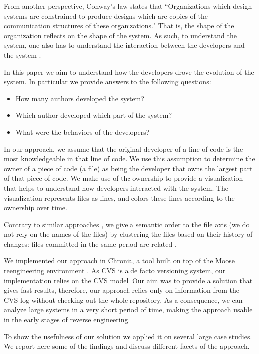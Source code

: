 From another perspective, Conway's law \cite{Conw68a} states that ``Organizations which design systems are constrained to produce designs which are copies of the communication structures of these organizations." That is, the shape of the organization reflects on the shape of the system. As such, to understand the system, one also has to understand the interaction between the developers and the system \cite{Deme02a}.

In this paper we aim to understand how the developers drove the evolution of the system. In particular we provide answers to the following questions:
\begin{itemize}
\item How many authors developed the system?
\item Which author developed which part of the system?
\item What were the behaviors of the developers?
\end{itemize}

In our approach, we assume that the original developer of a line of code is the most knowledgeable in that line of code. We use this assumption to determine the owner of a piece of code (\eg a file) as being the developer that owns the largest part of that piece of code. We make use of the ownership to provide a visualization that helps to understand how developers interacted with the system. The visualization represents files as lines, and colors these lines according to the ownership over time.

Contrary to similar approaches \cite{Ryss04a}, we give a semantic order to the file axis (\ie we do not rely on the names of the files) by clustering the files based on their history of changes: files committed in the same period are related \cite{Gall98a}.

We implemented our approach in Chronia, a tool built on top of the Moose reengineering environment \cite{Duca05a}. As CVS is a de facto versioning system, our implementation relies on the CVS model. Our aim was to provide a solution that gives fast results, therefore, our approach relies only on information from the CVS log without checking out the whole repository. As a consequence, we can analyze large systems in a very short period of time, making the approach usable in the early stages of reverse engineering.

To show the usefulness of our solution we applied it on several large case studies. We report here some of the findings and discuss different facets of the approach.

